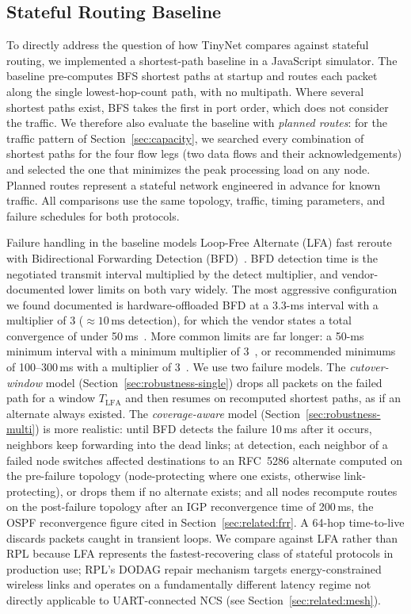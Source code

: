 \subsection{Stateful Routing Baseline}
\label{sec:comparison}
To directly address the question of how TinyNet compares against stateful routing, we implemented a shortest-path baseline in a JavaScript simulator. The baseline pre-computes BFS shortest paths at startup and routes each packet along the single lowest-hop-count path, with no multipath. Where several shortest paths exist, BFS takes the first in port order, which does not consider the traffic. We therefore also evaluate the baseline with \emph{planned routes}: for the traffic pattern of Section~\ref{sec:capacity}, we searched every combination of shortest paths for the four flow legs (two data flows and their acknowledgements) and selected the one that minimizes the peak processing load on any node. Planned routes represent a stateful network engineered in advance for known traffic. All comparisons use the same topology, traffic, timing parameters, and failure schedules for both protocols.

Failure handling in the baseline models Loop-Free Alternate (LFA) fast reroute~\cite{rfc5286,cisco_lfa} with Bidirectional Forwarding Detection (BFD)~\cite{rfc5880}. BFD detection time is the negotiated transmit interval multiplied by the detect multiplier, and vendor-documented lower limits on both vary widely. The most aggressive configuration we found documented is hardware-offloaded BFD at a 3.3-ms interval with a multiplier of 3 ($\approx\!10\,\mathrm{ms}$ detection), for which the vendor states a total convergence of under 50\,ms~\cite{cisco_ncs4200_bfd}. More common limits are far longer: a 50-ms minimum interval with a minimum multiplier of 3~\cite{juniper_bfd}, or recommended minimums of 100--300\,ms with a multiplier of 3~\cite{juniper_bfd}. We use two failure models. The \emph{cutover-window} model (Section~\textcolor{red}{\ref{sec:robustness-single}}) drops all packets on the failed path for a window $T_{\mathrm{LFA}}$ and then resumes on recomputed shortest paths, as if an alternate always existed. The \emph{coverage-aware} model (Section~\textcolor{red}{\ref{sec:robustness-multi}}) is more realistic: until BFD detects the failure 10\,ms after it occurs, neighbors keep forwarding into the dead links; at detection, each neighbor of a failed node switches affected destinations to an RFC~5286 alternate computed on the pre-failure topology (node-protecting where one exists, otherwise link-protecting), or drops them if no alternate exists; and all nodes recompute routes on the post-failure topology after an IGP reconvergence time of 200\,ms, the OSPF reconvergence figure cited in Section~\ref{sec:related:frr}. A 64-hop time-to-live discards packets caught in transient loops. We compare against LFA rather than RPL because LFA represents the fastest-recovering class of stateful protocols in production use; RPL's DODAG repair mechanism targets energy-constrained wireless links and operates on a fundamentally different latency regime not directly applicable to UART-connected NCS (see Section~\ref{sec:related:mesh}).

